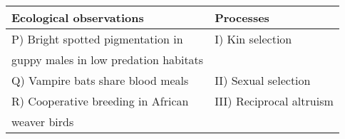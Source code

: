 \begin{tabular}{|l|l|}
\hline
\textbf{Ecological observations} & \textbf{Processes} \\
\hline
P) Bright spotted pigmentation in & I) Kin selection \\
guppy males in low predation habitats & \\
\hline
Q) Vampire bats share blood meals & II) Sexual selection \\
\hline
R) Cooperative breeding in African & III) Reciprocal altruism \\
weaver birds & \\
\hline
\end{tabular} \\